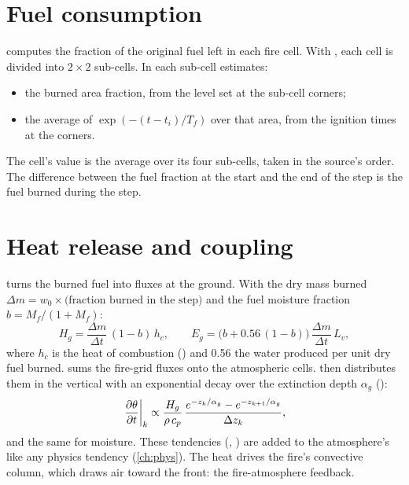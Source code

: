 \section{Fuel consumption}

 computes the fraction of the original fuel left in each fire cell. With
, each cell is divided into $2\times2$ sub-cells. In each sub-cell
 estimates:
\begin{itemize}
  \item the burned area fraction, from the level set at the sub-cell corners;
  \item the average of $\exp(-(t - t_i)/T_f)$ over that area, from the ignition times at the corners.
\end{itemize}
The cell's value is the average over its four sub-cells, taken in the source's order. The difference between the
fuel fraction at the start and the end of the step is the fuel burned during the step.

\section{Heat release and coupling}

 turns the burned fuel into fluxes at the ground. With the dry mass burned
$\Delta m = w_0 \times \text{(fraction burned in the step)}$ and the fuel moisture fraction
$b = M_f/(1 + M_f)$:
\begin{equation}
  H_g = \frac{\Delta m}{\Delta t}\,(1 - b)\,h_c, \qquad
  E_g = \bigl(b + 0.56\,(1 - b)\bigr)\,\frac{\Delta m}{\Delta t}\,L_v ,
\end{equation}
where $h_c$ is the heat of combustion () and 0.56 the water produced per unit dry fuel burned.
 sums the fire-grid fluxes onto the atmospheric cells.
 then distributes them in the vertical with an exponential decay over
the extinction depth $\alpha_g$ ():
\begin{equation}
  \left.\frac{\partial \theta}{\partial t}\right|_{k} \propto \frac{H_g}{\rho\,c_p}\,\frac{e^{-z_{k}/\alpha_g} - e^{-z_{k+1}/\alpha_g}}{\Delta z_k},
\end{equation}
and the same for moisture. These tendencies (, ) are added to the atmosphere's like any
physics tendency (\cref{ch:phys}). The heat drives the fire's convective column, which draws air toward the front:
the fire-atmosphere feedback.

